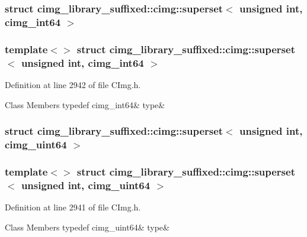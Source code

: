 \subsubsection{struct cimg\+\_\+library\+\_\+suffixed\+:\+:cimg\+:\+:superset$<$ unsigned int, cimg\+\_\+int64 $>$}
\subsubsection*{template$<$$>$\newline
struct cimg\+\_\+library\+\_\+suffixed\+::cimg\+::superset$<$ unsigned int, cimg\+\_\+int64 $>$}



Definition at line 2942 of file C\+Img.\+h.

\begin{DoxyFields}{Class Members}
\mbox{\label{namespacecimg__library__suffixed_1_1cimg_a0491ed6320d98a3c2b30dd6780e8a301}} 
typedef cimg\_int64&
type&
\\
\hline

\end{DoxyFields}
\label{structcimg__library__suffixed_1_1cimg_1_1superset_3_01unsigned_01int_00_01cimg__uint64_01_4}
\subsubsection{struct cimg\+\_\+library\+\_\+suffixed\+:\+:cimg\+:\+:superset$<$ unsigned int, cimg\+\_\+uint64 $>$}
\subsubsection*{template$<$$>$\newline
struct cimg\+\_\+library\+\_\+suffixed\+::cimg\+::superset$<$ unsigned int, cimg\+\_\+uint64 $>$}



Definition at line 2941 of file C\+Img.\+h.

\begin{DoxyFields}{Class Members}
\mbox{\label{namespacecimg__library__suffixed_1_1cimg_a2f82a9bf57e51c773ec4956a94422eaf}} 
typedef cimg\_uint64&
type&
\\
\hline

\end{DoxyFields}
\label{structcimg__library__suffixed_1_1cimg_1_1superset_3_01unsigned_01int_00_01double_01_4}
